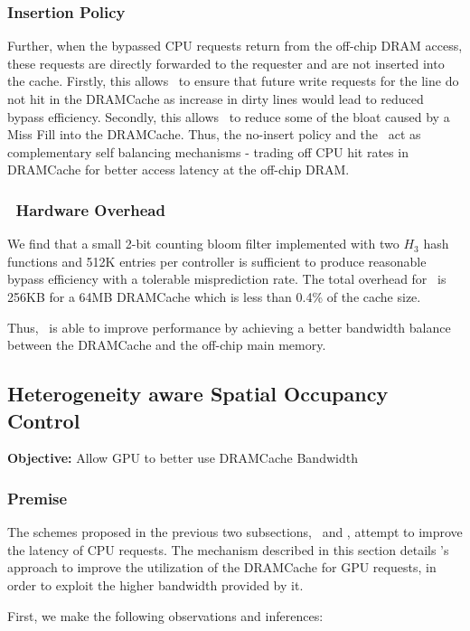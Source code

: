 \subsubsection{Insertion Policy}
\par Further, when the bypassed CPU requests return from the off-chip DRAM access, these requests are directly forwarded to the requester and are not inserted into the cache. 
Firstly, this allows \bypassname\ to ensure that future write requests for the line do not hit in the DRAMCache as increase in dirty lines would lead to reduced bypass efficiency. 
Secondly, this allows \bypassname\ to reduce some of the bloat caused by a Miss Fill \cite{bear} into the DRAMCache.
Thus, the no-insert policy and the \bypassname\ act as complementary self balancing mechanisms - trading off CPU hit rates in DRAMCache for better access latency at the off-chip DRAM.
\subsubsection{\bypassname\ Hardware Overhead}
\par We find that a small 2-bit counting bloom filter implemented with two $H_3$ hash functions \cite{h3} and 512K entries per controller is sufficient 
to produce reasonable bypass efficiency with a tolerable misprediction rate. The total overhead for \bypassname\ is 256KB for a 64MB DRAMCache which is less than 0.4\% of the cache size.
\par Thus, \bypassname\ is able to improve performance by achieving a better bandwidth balance between the DRAMCache and the off-chip main memory.


\subsection{Heterogeneity aware Spatial Occupancy Control} \label{mechanism-chaining}
\textbf{Objective:} Allow GPU to better use DRAMCache Bandwidth
\subsubsection{Premise}
The schemes proposed in the previous two subsections, \prioname\ and \bypassname, attempt to improve the latency of CPU requests. The mechanism described in this section details \cachename's approach to improve the utilization of the DRAMCache for GPU requests, in order to exploit the higher bandwidth provided by it. 
\par First, we make the following observations and inferences: 

